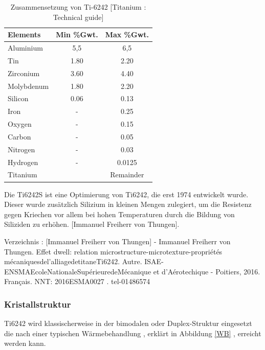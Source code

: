 \begin{table}[H]
	\centering	
	\begin{tabular}{|l |c |c|}
		\hline
		\centering
		\hspace{20ex}Elements \hspace{20ex} & Min \%Gwt. & Max \%Gwt.\\
		\hline
		Aluminium&5,5&6,5\\
		Tin&1.80&2.20\\
		Zirconium&3.60&4.40\\
		Molybdenum&1.80&2.20\\
		Silicon &0.06&0.13\\
		Iron&-&0.25\\
		Oxygen&-&0.15\\
		Carbon&	-&	0.05\\
		Nitrogen&-&0.03\\
		Hydrogen&-&0.0125\\
		
		Titanium &&Remainder\\
		\hline
	\end{tabular}
	\caption{Zusammensetzung von Ti-6242 [Titanium : Technical guide]}
\end{table}


Die Ti6242S ist eine Optimierung von Ti6242, die erst 1974 entwickelt wurde. Dieser wurde zusätzlich Silizium in kleinen Mengen zulegiert, um die Resistenz gegen Kriechen vor allem bei hohen Temperaturen durch die Bildung von Siliziden zu erhöhen.  [Immanuel Freiherr von Thungen]. 

Verzeichnis : [Immanuel Freiherr von Thungen] - Immanuel Freiherr von Thungen. Effet dwell: relation microstructure-microtexture-propriétés mécaniquesdel’alliagedetitaneTi6242. Autre. ISAE-ENSMAEcoleNationaleSupérieuredeMécanique et d’Aérotechique - Poitiers, 2016. Français. NNT: 2016ESMA0027 .  tel-01486574
\subsubsection{Kristallstruktur}

Ti6242 wird klassischerweise in der bimodalen oder Duplex-Struktur eingesetzt die nach einer typischen Wärmebehandlung , erklärt in Abbildung \ref{WB} , erreicht  werden kann.


